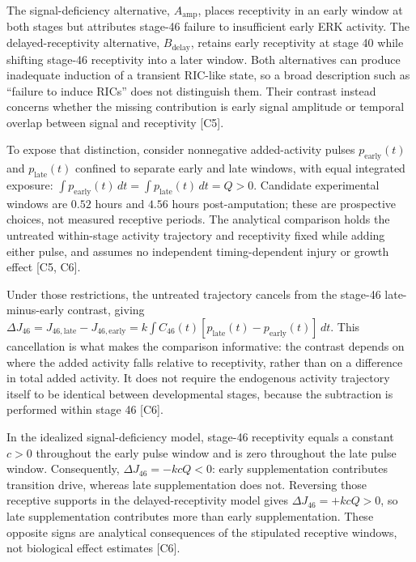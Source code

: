 \documentclass[11pt]{article}
\begin{document}
The signal-deficiency alternative, $A_{\mathrm{amp}}$, places receptivity in an early window at both stages but attributes stage-46 failure to insufficient early ERK activity. The delayed-receptivity alternative, $B_{\mathrm{delay}}$, retains early receptivity at stage 40 while shifting stage-46 receptivity into a later window. Both alternatives can produce inadequate induction of a transient RIC-like state, so a broad description such as \textquotedblleft{}failure to induce RICs\textquotedblright{} does not distinguish them. Their contrast instead concerns whether the missing contribution is early signal amplitude or temporal overlap between signal and receptivity [C5].

To expose that distinction, consider nonnegative added-activity pulses $p_{\mathrm{early}}(t)$ and $p_{\mathrm{late}}(t)$ confined to separate early and late windows, with equal integrated exposure: $\int p_{\mathrm{early}}(t)\,dt=\int p_{\mathrm{late}}(t)\,dt=Q>0$. Candidate experimental windows are $0.5$\textendash{}$2$ hours and $4.5$\textendash{}$6$ hours post-amputation; these are prospective choices, not measured receptive periods. The analytical comparison holds the untreated within-stage activity trajectory and receptivity fixed while adding either pulse, and assumes no independent timing-dependent injury or growth effect [C5, C6].

Under those restrictions, the untreated trajectory cancels from the stage-46 late-minus-early contrast, giving $\Delta J_{46}=J_{46,\mathrm{late}}-J_{46,\mathrm{early}}=k\int C_{46}(t)[p_{\mathrm{late}}(t)-p_{\mathrm{early}}(t)]\,dt$. This cancellation is what makes the comparison informative: the contrast depends on where the added activity falls relative to receptivity, rather than on a difference in total added activity. It does not require the endogenous activity trajectory itself to be identical between developmental stages, because the subtraction is performed within stage 46 [C6].

In the idealized signal-deficiency model, stage-46 receptivity equals a constant $c>0$ throughout the early pulse window and is zero throughout the late pulse window. Consequently, $\Delta J_{46}=-kcQ<0$: early supplementation contributes transition drive, whereas late supplementation does not. Reversing those receptive supports in the delayed-receptivity model gives $\Delta J_{46}=+kcQ>0$, so late supplementation contributes more than early supplementation. These opposite signs are analytical consequences of the stipulated receptive windows, not biological effect estimates [C6].
\end{document}
